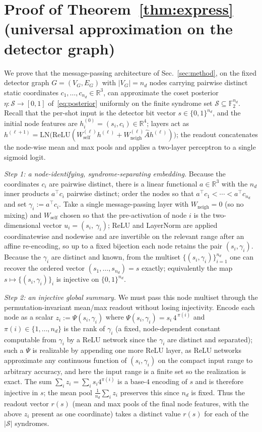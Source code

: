 \documentclass[aps,prxquantum,twocolumn,superscriptaddress,nofootinbib,longbibliography]{revtex4-2}
\newcommand{\R}{\mathbb{R}}
\newcommand{\F}{\mathbb{F}}
\newcommand{\cS}{\mathcal{S}}
\begin{document}
\appendix

\section{Proof of Theorem~\ref{thm:express} (universal approximation on the detector graph)}
\label{app:express}

We prove that the message-passing architecture of Sec.~\ref{sec:method}, on the
fixed detector graph $G=(V_G,E_G)$ with $|V_G|=n_d$ nodes carrying pairwise
distinct static coordinates $c_1,\dots,c_{n_d}\in\R^3$, can approximate the coset
posterior $\eta:\cS\to[0,1]$ of~\eqref{eq:posterior} uniformly on the finite
syndrome set $\cS\subseteq\F_2^{n_d}$. Recall that the per-shot input is the
detector bit vector $s\in\{0,1\}^{n_d}$, and the initial node features are
$h^{(0)}_i=(s_i,c_i)\in\R^4$; layers act as
$h^{(\ell+1)}=\mathrm{LN}\big(\mathrm{ReLU}(W^{(\ell)}_{\mathrm{self}}h^{(\ell)}
+W^{(\ell)}_{\mathrm{neigh}}\hat A h^{(\ell)})\big)$; the readout concatenates the
node-wise mean and max pools and applies a two-layer perceptron to a single
sigmoid logit.

\emph{Step 1: a node-identifying, syndrome-separating embedding.}
Because the coordinates $c_i$ are pairwise distinct, there is a linear functional
$a\in\R^3$ with the $n_d$ inner products $a^\top c_i$ pairwise distinct; order
the nodes so that $a^\top c_1<\cdots<a^\top c_{n_d}$ and set $\gamma_i:=a^\top c_i$.
Take a single message-passing layer with $W_{\mathrm{neigh}}=0$ (so no mixing) and
$W_{\mathrm{self}}$ chosen so that the pre-activation of node $i$ is the
two-dimensional vector $u_i=(s_i,\ \gamma_i)$; ReLU and LayerNorm are applied
coordinatewise and node\-wise and are invertible on the relevant range after an
affine re-encoding, so up to a fixed bijection each node retains the pair
$(s_i,\gamma_i)$. Because the $\gamma_i$ are distinct and known, from the multiset
$\{(s_i,\gamma_i)\}_{i=1}^{n_d}$ one can recover the ordered vector
$(s_1,\dots,s_{n_d})=s$ exactly; equivalently the map $s\mapsto\{(s_i,\gamma_i)\}_i$
is injective on $\{0,1\}^{n_d}$.

\emph{Step 2: an injective global summary.}
We must pass this node multiset through the permutation-invariant mean/max readout
without losing injectivity. Encode each node as a scalar
$z_i:=\Psi(s_i,\gamma_i)$ where $\Psi(s_i,\gamma_i)=s_i\,4^{\,\pi(i)}$ and
$\pi(i)\in\{1,\dots,n_d\}$ is the rank of $\gamma_i$ (a fixed, node-dependent
constant computable from $\gamma_i$ by a ReLU network since the $\gamma_i$ are
distinct and separated); such a $\Psi$ is realizable by appending one more
ReLU layer, as ReLU networks approximate any continuous function of
$(s_i,\gamma_i)$ on the compact input range to arbitrary accuracy, and here the
input range is a finite set so the realization is exact. The sum
$\sum_i z_i=\sum_i s_i 4^{\pi(i)}$ is a base-$4$ encoding of $s$ and is therefore
injective in $s$; the mean pool $\frac1{n_d}\sum_i z_i$ preserves this since
$n_d$ is fixed. Thus the readout vector $r(s)$ (mean and max pools of the final
node features, with the above $z_i$ present as one coordinate) takes a distinct
value $r(s)$ for each of the $|\cS|$ syndromes.
\end{document}
